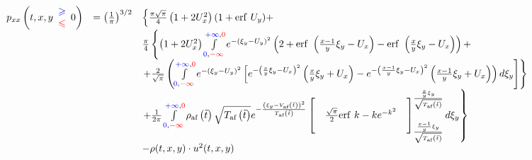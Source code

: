 \begin{equation*}
\begin{array}{ r l l }
p_{xx}\left( t,x, y\begin{array}{ c }
\textcolor[rgb]{0,0,1}{\geqslant }\\
\textcolor[rgb]{1,0,0}{\leqslant }
\end{array} 0\right) & =\left(\frac{1}{\pi }\right)^{3/2} & \left\{\frac{\pi \sqrt{\pi }}{4}\left( 1+2U_{x}^{2}\right)( 1+\mathrm{erf} \ U_{y}) +\right. \\
 &  & \frac{\pi }{4}\left\{\left( 1+2U_{x}^{2}\right)\int\limits _{\textcolor[rgb]{0,0,1}{0} ,\textcolor[rgb]{1,0,0}{-\infty }}^{\textcolor[rgb]{0,0,1}{+\infty } ,\textcolor[rgb]{1,0,0}{0}} e^{-( \xi _{y} -U_{y})^{2}}\left( 2+\mathrm{erf} \ \left(\frac{x-1}{y} \xi _{y} -U_{x}\right) -\mathrm{erf} \ \left(\frac{x}{y} \xi _{y} -U_{x}\right)\right) +\right. \\
 &  & \left. +\frac{2}{\sqrt{\pi }}\left(\int\limits _{\textcolor[rgb]{0,0,1}{0} ,\textcolor[rgb]{1,0,0}{-\infty }}^{\textcolor[rgb]{0,0,1}{+\infty } ,\textcolor[rgb]{1,0,0}{0}} e^{-( \xi _{y} -U_{y})^{2}}\left[ e^{-\left(\frac{x}{y} \xi _{y} -U_{x}\right)^{2}}\left(\frac{x}{y} \xi _{y} +U_{x}\right) -e^{-\left(\frac{x-1}{y} \xi _{y} -U_{x}\right)^{2}}\left(\frac{x-1}{y} \xi _{y} +U_{x}\right)\right) d\xi _{y}\right]\right\}\\
 &  & \left. +\frac{1}{2\pi }\int\limits _{\textcolor[rgb]{0,0,1}{0} ,\textcolor[rgb]{1,0,0}{-\infty }}^{\textcolor[rgb]{0,0,1}{+\infty } ,\textcolor[rgb]{1,0,0}{0}} \rho _{\text{af}}\left(\tilde{t}\right)\sqrt{T_{\text{af}}\left(\tilde{t}\right)} e^{-\frac{\left( \xi _{y} -V_{\text{af}}\left(\tilde{t}\right)\right)^{2}}{T_{\text{af}}\left(\tilde{t}\right)}}\left[
 \begin{array}{ c }
 \\\\
 \\
\end{array}
\frac{\sqrt{\pi }}{2}\mathrm{erf} \ k -ke^{-k^{2}}
\begin{array}{ c }
 \\\\
 \\
\end{array}
\right]_{\frac{\frac{x-1}{y} \xi _{y}}{\sqrt{T_{\text{af}}\left(\tilde{t}\right)}}}^{\frac{\frac{x}{y} \xi _{y}}{\sqrt{T_{\text{af}}\left(\tilde{t}\right)}}} d\xi _{y}\right\}\\
 &  & -\rho ( t,x,y) \cdot u^{2}( t,x,y)
\end{array}
\end{equation*}

